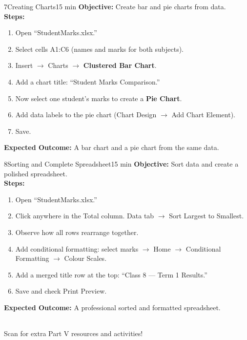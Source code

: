 \begin{labactivity}{7}{Creating Charts}{15 min}
\textbf{Objective:} Create bar and pie charts from data.\\[4pt]
\textbf{Steps:}
\begin{enumerate}[label=\protect\stepcircle{\arabic*}, leftmargin=2cm, itemsep=4pt]
  \item Open ``StudentMarks.xlsx.''
  \item Select cells A1:C6 (names and marks for both subjects).
  \item Insert $\rightarrow$ Charts $\rightarrow$ \textbf{Clustered Bar Chart}.
  \item Add a chart title: ``Student Marks Comparison.''
  \item Now select one student's marks to create a \textbf{Pie Chart}.
  \item Add data labels to the pie chart (Chart Design $\rightarrow$ Add Chart Element).
  \item Save.
\end{enumerate}
\textbf{Expected Outcome:} A bar chart and a pie chart from the same data.
\welldone
\end{labactivity}

\begin{labactivity}{8}{Sorting and Complete Spreadsheet}{15 min}
\textbf{Objective:} Sort data and create a polished spreadsheet.\\[4pt]
\textbf{Steps:}
\begin{enumerate}[label=\protect\stepcircle{\arabic*}, leftmargin=2cm, itemsep=4pt]
  \item Open ``StudentMarks.xlsx.''
  \item Click anywhere in the Total column. Data tab $\rightarrow$ Sort Largest to Smallest.
  \item Observe how all rows rearrange together.
  \item Add conditional formatting: select marks $\rightarrow$ Home $\rightarrow$ Conditional Formatting $\rightarrow$ Colour Scales.
  \item Add a merged title row at the top: ``Class 8 --- Term 1 Results.''
  \item Save and check Print Preview.
\end{enumerate}
\textbf{Expected Outcome:} A professional sorted and formatted spreadsheet.
\welldone
\end{labactivity}

\vspace{12pt}
\begin{center}
  \\[6pt]
  {\small\sffamily\textcolor{NavyBlue}{Scan for extra Part V resources and activities!}}
\end{center}
